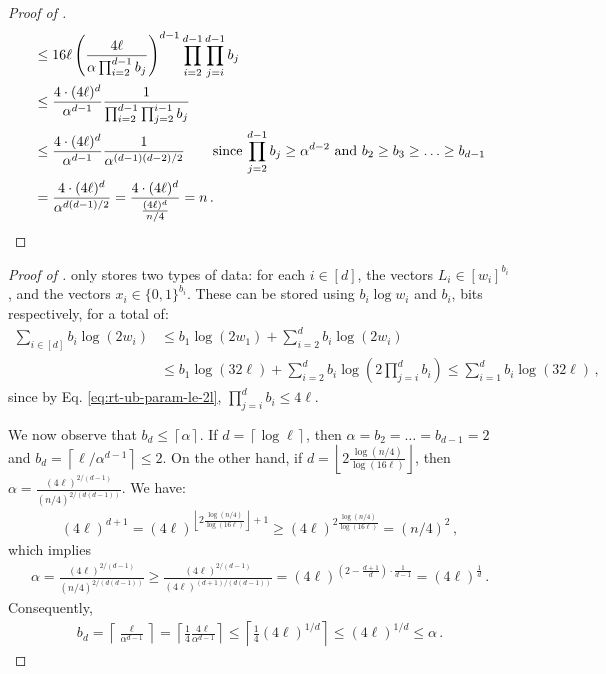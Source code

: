 \documentclass[10pt,a4paper]{article}
\theoremstyle{definition}
\theoremstyle{remark}
\newcommand{\ceil}[1]{{\left\lceil{#1}\right\rceil}}
\newcommand{\floor}[1]{{\left\lfloor{#1}\right\rfloor}}
\newcommand{\rl}{\mathbf{\ell}}             %
\begin{document}
\begin{itemize}
\begin{itemize}
\begin{proof}[Proof of ]
\begin{align*}
      &\le 16 \rl \left(\frac{4 \rl}{\alpha \prod_{i=2}^{d-1} b_j} \right)^{d-1} \prod_{i = 2}^{d-1} \prod_{j=i}^{d-1} b_j \\
      &\le \frac{4 \cdot (4 \rl)^d}{\alpha^{d-1}} \frac{1}{\prod_{i = 2}^{d-1} \prod_{j=2}^{i-1} b_j} \\
      &\le \frac{4 \cdot(4 \rl)^d}{\alpha^{d-1}} \frac{1}{\alpha^{(d-1)(d-2)/2}} \qquad \text{since $\prod_{j=2}^{d-1} b_j \ge \alpha^{d-2}$ and $b_2 \ge b_3 \ge \ldots \ge b_{d-1}$} \\
      &= \frac{4 \cdot(4 \rl)^d}{\alpha^{d(d-1)/2}} = \frac{4 \cdot(4 \rl)^{d}}{\frac{(4 \rl)^d}{n / 4}} = n \,. \qedhere
  \end{align*}
\end{proof}




\begin{proof}[Proof of ]
   only stores two types of data: for each $i\in[d]$, the vectors $L_i \in [w_i]^{b_i}$, and the vectors $x_i \in \{0,1\}^{b_i}$. These can be stored using $b_i \log w_i$ and $b_i$, bits respectively, for a total of:
  \begin{align*}
    \sum_{i \in [d]} b_i \log(2 w_i) &\le b_1 \log(2 w_1) + \sum_{i = 2}^{d} b_i \log(2 w_i) \\
      &\le b_1 \log(32 \rl) + \sum_{i = 2}^{d} b_i \log(2 \prod_{j=i}^{d} b_i)
      \le \sum_{i=1}^{d} b_i \log(32 \rl) \,,
  \end{align*}
  since by Eq. \ref{eq:rt-ub-param-le-2l}, $\prod_{j=i}^{d} b_i \le 4 \rl$. 
  
  We now observe that $b_d \le \ceil{\alpha}$. If $d = \ceil{\log \rl}$,
  then $\alpha = b_2 = \ldots = b_{d - 1} = 2$ and $b_d = \ceil{\rl/\alpha^{d - 1}} \le 2$. On the other hand, if $d = \floor{2 \frac{\log(n/4)}{\log(16\rl)}}$, then $\alpha = \frac{(4 \rl)^{2/(d-1)}}{(n/4)^{2/(d(d-1))}}$. We have:
  \begin{align*}
    (4\rl)^{d + 1} = (4\rl)^{\floor{2 \frac{\log(n/4)}{\log(16\rl)}} + 1} \ge (4\rl)^{2 \frac{\log(n/4)}{\log(16\rl)}} = (n/4)^2 \,,
  \end{align*}
  which implies
  \begin{align*}
    \alpha = \frac{(4 \rl)^{2/(d-1)}}{(n/4)^{2/(d(d-1))}} \ge \frac{(4 \rl)^{2/(d-1)}}{(4\rl)^{(d+1)/(d(d-1))}} = (4\rl)^{(2 - \frac{d+1}{d}) \cdot \frac{1}{d - 1}} = (4\rl)^{\frac{1}{d}} \,.
  \end{align*}
  Consequently,
  \begin{align*}
    b_d = \ceil{\frac{\rl}{\alpha^{d - 1}}} = \ceil{\frac{1}{4} \frac{4 \rl}{\alpha^{d - 1}}} \le \ceil{\frac{1}{4} (4 \rl)^{1/d}} \le (4 \rl)^{1/d} \le \alpha \,.
  \end{align*}
  

\end{proof}
\end{itemize}
\end{itemize}
\end{document}
